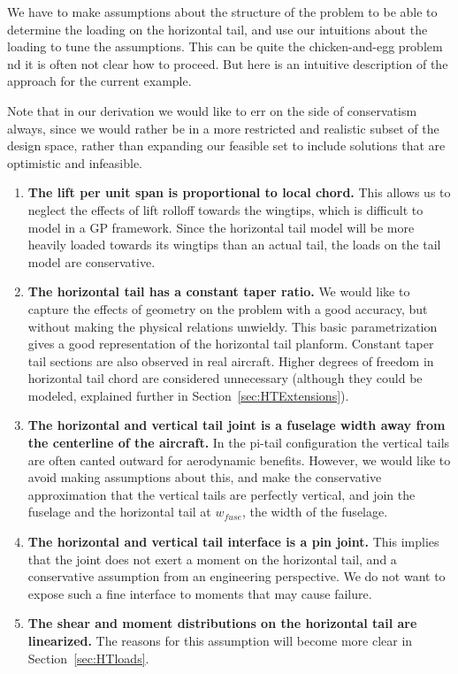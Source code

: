 We have to make assumptions about the structure of the problem to be able
to determine the loading on the horizontal tail, and use our intuitions about the 
loading to tune the assumptions. This can be quite the chicken-and-egg problem
nd it is often not clear how to proceed. But here is an 
intuitive description of the approach for the current example. 

Note that in our derivation we would like to err on the side of conservatism always, since we would
rather be in a more restricted and realistic subset of the design space, rather than 
expanding our feasible set to include solutions that are optimistic and infeasible. 

\begin{enumerate}
    \item \textbf{The lift per unit span is proportional to local chord.} This allows 
    us to neglect the effects of lift rolloff towards the wingtips, which is difficult
    to model in a \gls{GP} framework.  Since the horizontal tail model will 
    be more heavily loaded towards its wingtips than an actual tail, the loads
    on the tail model are conservative. 
    \item \textbf{The horizontal tail has a constant taper ratio.} We would like to 
    capture the effects of geometry on the problem with a good 
    accuracy, but without making the physical relations unwieldy. This basic parametrization
    gives a good representation of the horizontal tail planform.  
    Constant taper tail sections are also observed in real aircraft. 
    Higher degrees of freedom in horizontal tail chord are considered unnecessary 
    (although they could be modeled, explained further in Section~\ref{sec:HTExtensions}). 
    \item \textbf{The horizontal and vertical tail joint is a fuselage width away from 
    the centerline of the aircraft.} In the pi-tail configuration the vertical tails are 
    often canted outward for aerodynamic benefits. However, we would like to avoid making 
    assumptions about this, and make the conservative approximation that the vertical tails
    are perfectly vertical, and join the fuselage and the horizontal tail at $w_{fuse}$, the
    width of the fuselage.
    \item \textbf{The horizontal and vertical tail interface is a pin joint.} This implies 
    that the joint does not exert a moment on the horizontal tail, and a conservative 
    assumption from an engineering perspective. We do not want to expose such a fine 
    interface to moments that may cause failure. \label{item:pinjoint}
    \item \textbf{The shear and moment distributions on the horizontal tail are 
    linearized.} The reasons for this assumption will become more clear in 
    Section~\ref{sec:HTloads}.
\end{enumerate}


